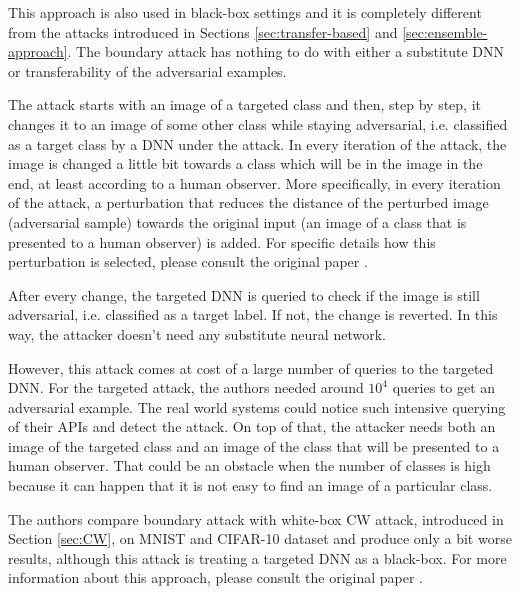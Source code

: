 This approach is also used in black-box settings and it is completely different from the attacks introduced in Sections \ref{sec:transfer-based} and \ref{sec:ensemble-approach}. The boundary attack has nothing to do with either a substitute DNN or transferability of the adversarial examples. 

The attack starts with an image of a targeted class and then, step by step, it changes it to an image of some other class while staying adversarial, i.e. classified as a target class by a DNN under the attack. In every iteration of the attack, the image is changed a little bit towards a class which will be in the image in the end, at least according to a human observer. More specifically, in every iteration of the attack, a perturbation that reduces the distance of the perturbed image (adversarial sample) towards the original input (an image of a class that is presented to a human observer) is added. For specific details how this perturbation is selected, please consult the original paper \cite{brendel2018decisionbased}.

After every change, the targeted DNN is queried to check if the image is still adversarial, i.e. classified as a target label. If not, the change is reverted. In this way, the attacker doesn't need any substitute neural network. 

However, this attack comes at cost of a large number of queries to the targeted DNN. For the targeted attack, the authors needed around $10^4$ queries to get an adversarial example. The real world systems could notice such intensive querying of their APIs and detect the attack. On top of that, the attacker needs both an image of the targeted class and an image of the class that will be presented to a human observer. That could be an obstacle when the number of classes is high because it can happen that it is not easy to find an image of a particular class.

The authors compare boundary attack with white-box CW attack, introduced in Section \ref{sec:CW}, on MNIST and CIFAR-10 dataset and produce only a bit worse results, although this attack is treating a targeted DNN as a black-box.  For more information about this approach, please consult the original paper \cite{brendel2018decisionbased}.
